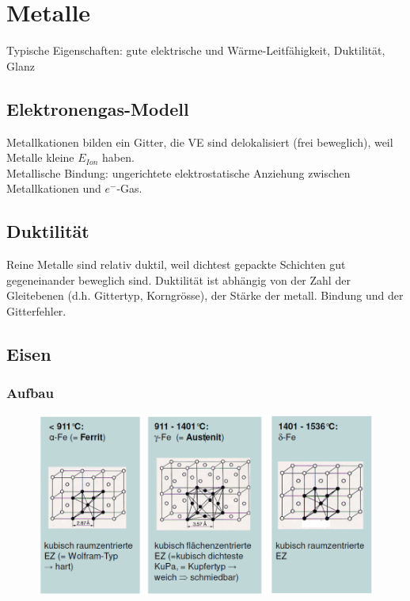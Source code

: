 \section{Metalle}
Typische Eigenschaften: gute elektrische und Wärme-Leitfähigkeit, Duktilität, Glanz \\

\subsection{Elektronengas-Modell}
Metallkationen bilden ein Gitter, die VE sind delokalisiert (frei beweglich), weil Metalle kleine $E_{Ion}$ haben. \\

Metallische Bindung: ungerichtete elektrostatische Anziehung zwischen Metallkationen und $e^-$-Gas. \\

\subsection{Duktilität}
Reine Metalle sind relativ duktil, weil dichtest gepackte Schichten gut gegeneinander beweglich sind. Duktilität ist abhängig von der Zahl der Gleitebenen (d.h. Gittertyp, Korngrösse), der Stärke der metall. Bindung und der Gitterfehler. 

\subsection{Eisen}
\subsubsection{Aufbau}
\begin{figure}[htbp]
	\centering
	\includegraphics[width=0.9\linewidth]{images/3_Aufbau_Eisen.png}
\end{figure}

